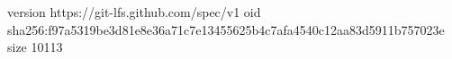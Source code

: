 version https://git-lfs.github.com/spec/v1
oid sha256:f97a5319be3d81e8e36a71c7e13455625b4c7afa4540c12aa83d5911b757023e
size 10113
